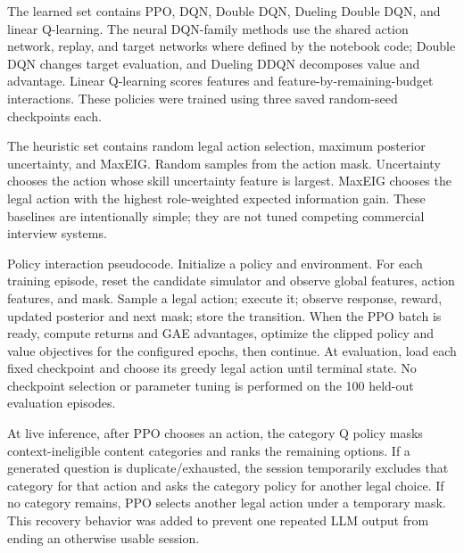 \documentclass{ieeeaccess}
\begin{document}
The learned set contains PPO, DQN, Double DQN, Dueling Double DQN, and linear Q-learning. The neural DQN-family methods use the shared action network, replay, and target networks where defined by the notebook code; Double DQN changes target evaluation, and Dueling DDQN decomposes value and advantage. Linear Q-learning scores features and feature-by-remaining-budget interactions. These policies were trained using three saved random-seed checkpoints each.

The heuristic set contains random legal action selection, maximum posterior uncertainty, and MaxEIG. Random samples from the action mask. Uncertainty chooses the action whose skill uncertainty feature is largest. MaxEIG chooses the legal action with the highest role-weighted expected information gain. These baselines are intentionally simple; they are not tuned competing commercial interview systems.

Policy interaction pseudocode. Initialize a policy and environment. For each training episode, reset the candidate simulator and observe global features, action features, and mask. Sample a legal action; execute it; observe response, reward, updated posterior and next mask; store the transition. When the PPO batch is ready, compute returns and GAE advantages, optimize the clipped policy and value objectives for the configured epochs, then continue. At evaluation, load each fixed checkpoint and choose its greedy legal action until terminal state. No checkpoint selection or parameter tuning is performed on the 100 held-out evaluation episodes.

At live inference, after PPO chooses an action, the category Q policy masks context-ineligible content categories and ranks the remaining options. If a generated question is duplicate/exhausted, the session temporarily excludes that category for that action and asks the category policy for another legal choice. If no category remains, PPO selects another legal action under a temporary mask. This recovery behavior was added to prevent one repeated LLM output from ending an otherwise usable session.
\end{document}
